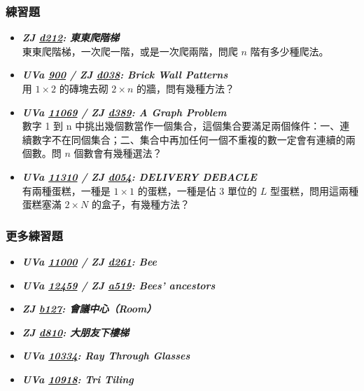 \subsubsection*{練習題}
\begin{itemize}[label={\Checkmark}]
\item \textbf{\textit{ZJ \href{http://zerojudge.tw/ShowProblem?problemid=d212}{d212}: 東東爬階梯}}\\
東東爬階梯，一次爬一階，或是一次爬兩階，問爬 $n$ 階有多少種爬法。
\item \textbf{\textit{UVa \href{http://uva.onlinejudge.org/external/9/900.html}{900} / ZJ \href{http://zerojudge.tw/ShowProblem?problemid=d038}{d038}: Brick Wall Patterns}}\\
用 $1\times{2}$ 的磚塊去砌 $2\times{n}$ 的牆，問有幾種方法？
\item \textbf{\textit{UVa \href{http://uva.onlinejudge.org/external/110/11069.html}{11069} / ZJ \href{http://zerojudge.tw/ShowProblem?problemid=d389}{d389}: A Graph Problem}}\\
數字 1 到 n 中挑出幾個數當作一個集合，這個集合要滿足兩個條件：一、連續數字不在同個集合；二、集合中再加任何一個不重複的數一定會有連續的兩個數。問 $n$ 個數會有幾種選法？
\item \textbf{\textit{UVa \href{http://uva.onlinejudge.org/external/113/11310.html}{11310} / ZJ \href{http://zerojudge.tw/ShowProblem?problemid=d054}{d054}: DELIVERY DEBACLE}}\\
有兩種蛋糕，一種是 $1\times{1}$ 的蛋糕，一種是佔 $3$ 單位的 $L$ 型蛋糕，問用這兩種蛋糕塞滿 $2\times{N}$ 的盒子，有幾種方法？
\end{itemize}
\subsubsection*{更多練習題}
\begin{itemize}[label={\PencilLeftDown}]
\item \textbf{\textit{UVa \href{http://uva.onlinejudge.org/external/110/11000.html}{11000} / ZJ \href{http://zerojudge.tw/ShowProblem?problemid=d261}{d261}: Bee}}
\item \textbf{\textit{UVa \href{http://uva.onlinejudge.org/external/124/12459.html}{12459} / ZJ \href{http://zerojudge.tw/ShowProblem?problemid=a519}{a519}: Bees' ancestors}}
\item \textbf{\textit{ZJ \href{http://zerojudge.tw/ShowProblem?problemid=b127}{b127}: 會議中心（Room）}}
\item \textbf{\textit{ZJ \href{http://zerojudge.tw/ShowProblem?problemid=d810}{d810}: 大朋友下樓梯}}
\item \textbf{\textit{UVa \href{http://uva.onlinejudge.org/external/103/10334.html}{10334}: Ray Through Glasses}}
\item \textbf{\textit{UVa \href{http://uva.onlinejudge.org/external/109/10918.html}{10918}: Tri Tiling}}
\end{itemize}